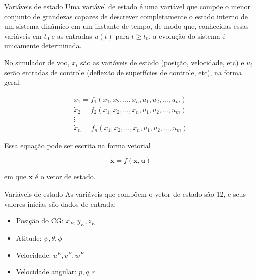 \documentclass{beamer}
\newcommand{\jindent}{\justifying\setlength{\parindent}{1.5em}}
\begin{document}
\begin{frame}{Variáveis de estado}
    \jindent
    Uma variável de estado é uma variável que compõe o menor conjunto de grandezas capazes de descrever completamente o estado interno de um sistema dinâmico em um instante de tempo, de modo que, conhecidas essas variáveis em $t_0$ e as entradas $u(t)$ para $t \ge t_0$, a evolução do sistema é unicamente determinada.

    \jindent
    No simulador de voo, $x_i$ são as variáveis de estado (posição, velocidade, etc) e $u_i$ serão entradas de controle (deflexão de superfícies de controle, etc), na forma geral:
    
    \begin{gather*}
        \dot{x}_1 = f_1(x_1, x_2, \dots, x_n, u_1, u_2, \dots, u_m) \\
        \dot{x}_2 = f_2(x_1, x_2, \dots, x_n, u_1, u_2, \dots, u_m) \\
        \vdots \\
        \dot{x}_n = f_n(x_1, x_2, \dots, x_n, u_1, u_2, \dots, u_m)
    \end{gather*}

    \jindent
    Essa equação pode ser escrita na forma vetorial

    \begin{equation*}
        \dot{\mathbf x} = f(\mathbf x, \mathbf u)
    \end{equation*}

    \justifying
    em que $\mathbf x$ é o vetor de estado. 
    
\end{frame}


\begin{frame}{Variáveis de estado}
    As variáveis que compõem o vetor de estado são 12, e seus valores inicias são dados de entrada:

    \begin{itemize}
        \item Posição do CG: $x_E, y_E, z_E$
        \item Atitude: $\psi, \theta, \phi$
        \item Velocidade: $u^E, v^E, w^E$
        \item Velocidade angular: $p, q, r$
    \end{itemize}

    \jindent

\end{frame}
\end{document}
